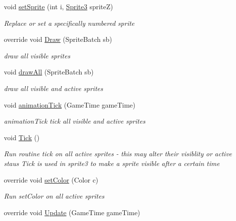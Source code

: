\begin{DoxyCompactItemize}
void \mbox{\hyperlink{class_r_c___framework_1_1_sprite_list_a9ddabec41f012b498c09368318c1941c}{set\+Sprite}} (int i, \mbox{\hyperlink{class_r_c___framework_1_1_sprite3}{Sprite3}} spriteZ)
\begin{DoxyCompactList}\small\item\em Replace or set a specifically numbered sprite \end{DoxyCompactList}\item 
override void \mbox{\hyperlink{class_r_c___framework_1_1_sprite_list_a4100c8d4abaa1e7268c17607d70b539a}{Draw}} (Sprite\+Batch sb)
\begin{DoxyCompactList}\small\item\em draw all visible sprites \end{DoxyCompactList}\item 
void \mbox{\hyperlink{class_r_c___framework_1_1_sprite_list_aab5a80e0d7a8340768db890a9af8a90c}{draw\+All}} (Sprite\+Batch sb)
\begin{DoxyCompactList}\small\item\em draw all visible and active sprites \end{DoxyCompactList}\item 
void \mbox{\hyperlink{class_r_c___framework_1_1_sprite_list_a501e6bd0f2a0910e5259db8189e23ce4}{animation\+Tick}} (Game\+Time game\+Time)
\begin{DoxyCompactList}\small\item\em animation\+Tick tick all visible and active sprites \end{DoxyCompactList}\item 
void \mbox{\hyperlink{class_r_c___framework_1_1_sprite_list_af36a07386a5b0f32a74473890868b3fc}{Tick}} ()
\begin{DoxyCompactList}\small\item\em Run routine tick on all active sprites -\/ this may alter their visiblity or active staus Tick is used in sprite3 to make a sprite visible after a certain time \end{DoxyCompactList}\item 
override void \mbox{\hyperlink{class_r_c___framework_1_1_sprite_list_aba7adceacb386357f811b5099d8885ca}{set\+Color}} (Color c)
\begin{DoxyCompactList}\small\item\em Run set\+Color on all active sprites \end{DoxyCompactList}\item 
override void \mbox{\hyperlink{class_r_c___framework_1_1_sprite_list_a816100deff7ad173c33904ac59f3ad79}{Update}} (Game\+Time game\+Time)

\end{DoxyCompactItemize}
